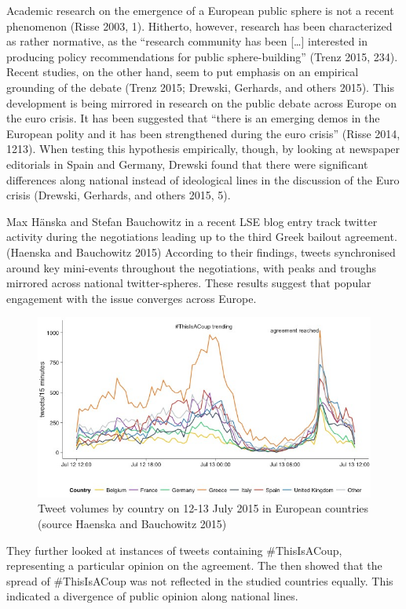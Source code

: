 \documentclass[]{article}
\begin{document}
Academic research on the emergence of a European public sphere is not a
recent phenomenon (Risse 2003, 1). Hitherto, however, research has been
characterized as rather normative, as the ``research community has been
{[}\ldots{}{]} interested in producing policy recommendations for public
sphere-building'' (Trenz 2015, 234). Recent studies, on the other hand,
seem to put emphasis on an empirical grounding of the debate (Trenz
2015; Drewski, Gerhards, and others 2015). This development is being
mirrored in research on the public debate across Europe on the euro
crisis. It has been suggested that ``there is an emerging demos in the
European polity and it has been strengthened during the euro crisis''
(Risse 2014, 1213). When testing this hypothesis empirically, though, by
looking at newspaper editorials in Spain and Germany, Drewski found that
there were significant differences along national instead of ideological
lines in the discussion of the Euro crisis (Drewski, Gerhards, and
others 2015, 5).

Max Hänska and Stefan Bauchowitz in a recent LSE blog entry track
twitter activity during the negotiations leading up to the third Greek
bailout agreement. (Haenska and Bauchowitz 2015) According to their
findings, tweets synchronised around key mini-events throughout the
negotiations, with peaks and troughs mirrored across national
twitter-spheres. These results suggest that popular engagement with the
issue converges across Europe.

\begin{figure}[htbp]
\centering
\includegraphics{img/Greece-twitter-1.jpg}
\caption{Tweet volumes by country on 12-13 July 2015 in European
countries (source Haenska and Bauchowitz 2015)}
\end{figure}

They further looked at instances of tweets containing \#ThisIsACoup,
representing a particular opinion on the agreement. The then showed that
the spread of \#ThisIsACoup was not reflected in the studied countries
equally. This indicated a divergence of public opinion along national
lines.
\end{document}
